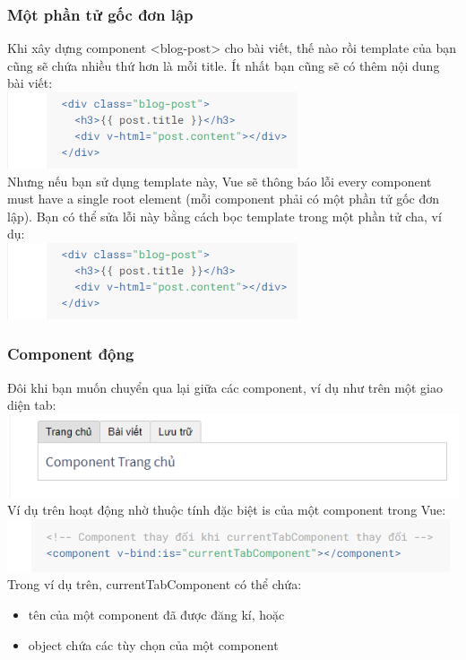 \documentclass[12pt,a4paper]{report}
\begin{document}
\subsubsection{Một phần tử gốc đơn lập}
Khi xây dựng component <blog-post> cho bài viết, thế nào rồi template của bạn cũng sẽ chứa nhiều thứ hơn là mỗi title. Ít nhất bạn cũng sẽ có thêm nội dung bài viết:\\\includegraphics[scale=1]{66}\\Nhưng nếu bạn sử dụng template này, Vue sẽ thông báo lỗi every component must have a single root element (mỗi component phải có một phần tử gốc đơn lập). Bạn có thể sửa lỗi này bằng cách bọc template trong một phần tử cha, ví dụ:\\\includegraphics[scale=1]{66}
\subsubsection{Component động}
Đôi khi bạn muốn chuyển qua lại giữa các component, ví dụ như trên một giao diện tab: \\\includegraphics[scale=1]{67}\\Ví dụ trên hoạt động nhờ thuộc tính đặc biệt is của một component trong Vue:\\\includegraphics[scale=1]{68}\\Trong ví dụ trên, currentTabComponent có thể chứa:\begin{itemize}
	\item tên của một component đã được đăng kí, hoặc
	\item object chứa các tùy chọn của một component
\end{itemize}
\end{document}
